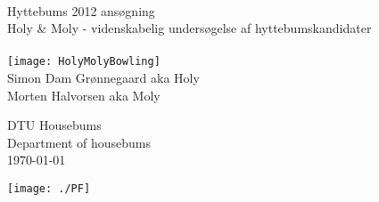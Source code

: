 \begin{titlepage}
\centering \parindent=0pt
 \HRule\\[1cm]\Huge
Hyttebums 2012 ansøgning\\[0.7cm]
\LARGE Holy \& Moly - videnskabelig undersøgelse af hyttebumskandidater\\[1cm]
\HRule\\[2cm]  
\texttt{[image: HolyMolyBowling]}\\ %

\Large Simon Dam Grønnegaard aka Holy\\ 
Morten Halvorsen aka Moly


 \normalsize %
\begin{flushleft} \Large
DTU Housebums\\
Department of housebums\\
\today \end{flushleft}
 \normalsize
\begin{flushright}
\texttt{[image: ./PF]}\\
\end{flushright}
\end{titlepage}